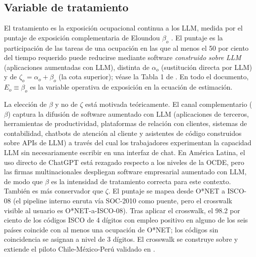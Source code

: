 \subsection{Variable de tratamiento}
\label{subsec:method_treatment}

El tratamiento es la exposición ocupacional continua a los LLM, medida por el puntaje de exposición complementaria de Eloundou $\beta_o$ \citep{Eloundou2023_gpt_exposure}. El puntaje es la participación de las tareas de una ocupación en las que al menos el 50 por ciento del tiempo requerido puede reducirse mediante software \emph{construido sobre LLM} (aplicaciones aumentadas con LLM), distinta de $\alpha_o$ (sustitución directa por LLM) y de $\zeta_o = \alpha_o + \beta_o$ (la cota superior); véase la Tabla 1 de \citet{Eloundou2023_gpt_exposure}. En todo el documento, $E_{o} \equiv \beta_o$ es la variable operativa de exposición en la ecuación de estimación.

La elección de $\beta$ y no de $\zeta$ está motivada teóricamente. El canal complementario ($\beta$) captura la difusión de software aumentado con LLM (aplicaciones de terceros, herramientas de productividad, plataformas de relación con clientes, sistemas de contabilidad, chatbots de atención al cliente y asistentes de código construidos sobre APIs de LLM) a través del cual los trabajadores experimentan la capacidad LLM sin necesariamente escribir en una interfaz de chat. En América Latina, el uso directo de ChatGPT está rezagado respecto a los niveles de la OCDE, pero las firmas multinacionales despliegan software empresarial aumentado con LLM, de modo que $\beta$ es la intensidad de tratamiento correcta para este contexto. También es más conservador que $\zeta$. El puntaje se mapea desde O*NET a ISCO-08 (el pipeline interno enruta vía SOC-2010 como puente, pero el crosswalk visible al usuario es O*NET-a-ISCO-08). Tras aplicar el crosswalk, el 98.2 por ciento de los códigos ISCO de 4 dígitos con empleo positivo en alguno de los seis países coincide con al menos una ocupación de O*NET; los códigos sin coincidencia se asignan a nivel de 3 dígitos. El crosswalk se construye sobre y extiende el piloto Chile-México-Perú validado en \citet{Azuara2024_idb_ai}.



